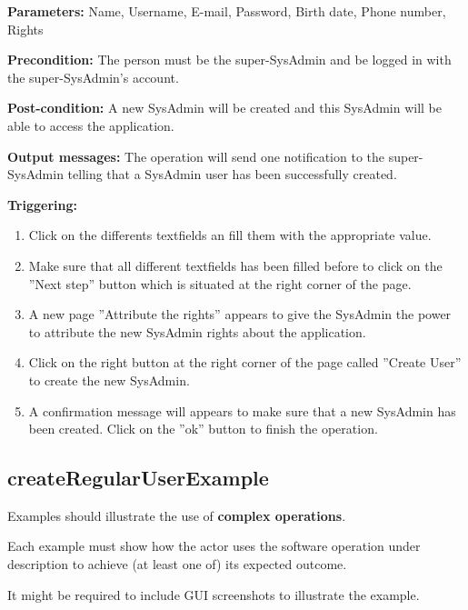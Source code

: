 \begin{description}

\item \textbf{Parameters:} Name, Username, E-mail, Password, Birth date, Phone
number, Rights
\item \textbf{Precondition:} The person must be the super-SysAdmin and be logged
in with the super-SysAdmin's account.
\item \textbf{Post-condition:} A new SysAdmin will be created and this
SysAdmin will be able to access the application.
\item \textbf{Output messages:} The operation will send one notification to the
super-SysAdmin telling that a SysAdmin user has been successfully created.


\item \textbf{Triggering:}
\begin{enumerate}
\item Click on the differents textfields an fill them with the appropriate
value.
\item Make sure that all different textfields has been filled before to
click on the ''Next step'' button which is situated at the right corner of the
page.
\item A new page ''Attribute the rights'' appears to give the SysAdmin the
power to attribute the new SysAdmin rights about the application.
\item Click on the right button at the right corner of the page called
''Create User'' to create the new SysAdmin.
\item A confirmation message will appears to make sure that a new SysAdmin
has been created. Click on the ''ok'' button to finish the operation.
\end{enumerate}

 
\end{description}

 
\subsection{createRegularUserExample}
Examples should illustrate the use of \textbf{complex operations}.

Each example must show how the actor uses the software operation under
description to achieve (at least one of) its expected outcome.

It might be required to include GUI screenshots to illustrate the example.

